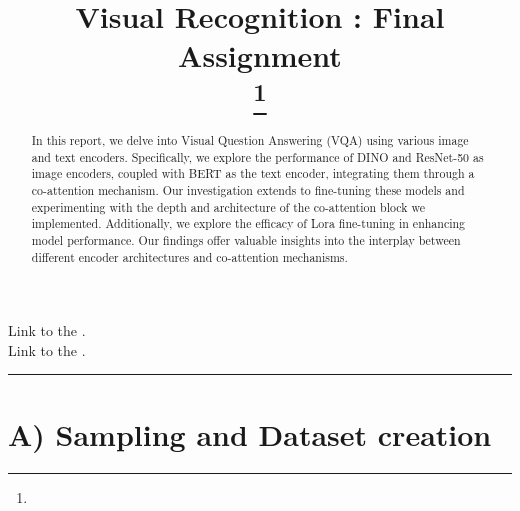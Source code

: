 \documentclass[conference]{IEEEtran}
\newcommand{\MYhref}[3][blue]{\href{#2}{\color{#1}{#3}}}
\begin{document}
\title{Visual Recognition : Final Assignment\\
{\footnotesize \textsuperscript{}}
\thanks{}
}


\author{
\and
{}
\and
{}

}

\maketitle

\begin{abstract}
In this report, we delve into Visual Question Answering (VQA) using various image and text encoders. Specifically, we explore the performance of DINO and ResNet-50 as image encoders, coupled with BERT as the text encoder, integrating them through a co-attention mechanism. Our investigation extends to fine-tuning these models and experimenting with the depth and architecture of the co-attention block we implemented. Additionally, we explore the efficacy of Lora fine-tuning in enhancing model performance. Our findings offer valuable insights into the interplay between different encoder architectures and co-attention mechanisms.
\end{abstract}


\begin{center}
Link to the \MYhref{https://github.com/Gapes21/VisualQuestionAnswering}{GitHub Repository}.\\
Link to the \MYhref{https://github.com/Gapes21/VisualQuestionAnswering}{Model Snapshots}.
\end{center}


\vspace{0.5cm} \hrule{} \vspace{0.5cm}
\section*{\textbf{A) Sampling and Dataset creation}}
\label{sampling}
\end{document}
